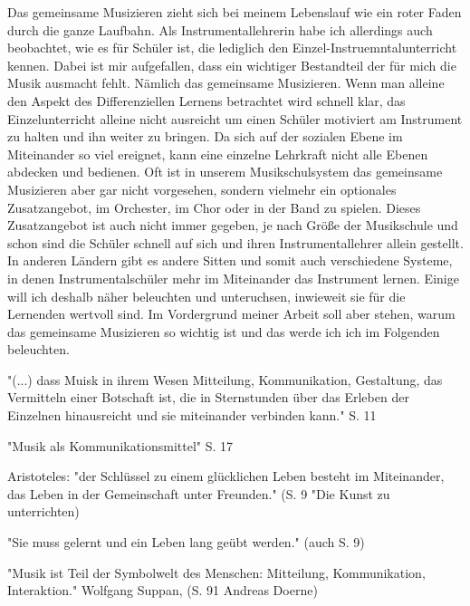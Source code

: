 Das gemeinsame Musizieren zieht sich bei meinem Lebenslauf wie ein roter Faden
durch die ganze Laufbahn. Als Instrumentallehrerin habe ich allerdings auch
beobachtet, wie es für Schüler ist, die lediglich den
Einzel-Instruemntalunterricht kennen. Dabei ist mir aufgefallen, dass ein
wichtiger Bestandteil der für mich die Musik ausmacht fehlt. Nämlich das
gemeinsame Musizieren. Wenn man alleine den Aspekt des
Differenziellen Lernens betrachtet wird schnell klar, das Einzelunterricht
alleine nicht ausreicht um einen Schüler motiviert am Instrument zu halten und
ihn weiter zu bringen. Da sich auf der sozialen Ebene im Miteinander so viel
ereignet, kann eine einzelne Lehrkraft nicht alle Ebenen abdecken und bedienen.
Oft ist in unserem Musikschulsystem das gemeinsame Musizieren aber gar nicht
vorgesehen, sondern vielmehr ein optionales Zusatzangebot, im Orchester, im Chor
oder in der Band zu spielen. Dieses Zusatzangebot ist auch nicht immer gegeben,
je nach Größe der Musikschule und schon sind die Schüler schnell auf sich und
ihren Instrumentallehrer allein gestellt. In anderen Ländern gibt es andere
Sitten und somit auch verschiedene Systeme, in denen Instrumentalschüler mehr im
Miteinander das Instrument lernen. Einige will ich deshalb näher beleuchten und
unteruchsen, inwieweit sie für die Lernenden wertvoll sind. Im Vordergrund
meiner Arbeit soll aber stehen, warum das gemeinsame Musizieren so
wichtig ist und das werde ich ich im Folgenden beleuchten. 


"(...) dass Muisk in ihrem Wesen Mitteilung, Kommunikation, Gestaltung, das
Vermitteln einer Botschaft ist, die in Sternstunden über das Erleben der
Einzelnen hinausreicht und sie miteinander verbinden kann." S. 11

"Musik als Kommunikationsmittel" S. 17

Aristoteles: "der Schlüssel zu einem glücklichen Leben besteht im Miteinander,
das Leben in der Gemeinschaft unter Freunden." (S. 9 "Die Kunst zu unterrichten)

"Sie muss gelernt und ein Leben lang geübt werden." (auch S. 9)


"Musik ist Teil der Symbolwelt des Menschen: Mitteilung, Kommunikation,
Interaktion." Wolfgang Suppan, (S. 91 Andreas Doerne)

